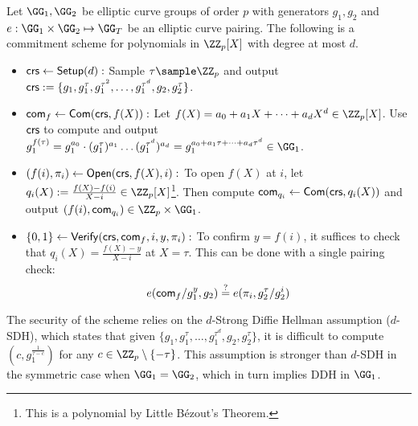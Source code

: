 \begin{construction}
Let $\GG_1, \GG_2$ be elliptic curve groups of order $p$ with generators $g_1,g_2$ and $e: \GG_1 \times \GG_2 \mapsto \GG_T$ be an elliptic curve pairing. The following is a commitment scheme for polynomials in $\ZZ_p[X]$ with degree at most $d$.
\begin{itemize}
    \item \underline{$\mathsf{crs} \gets {\mathsf{Setup}}(d):$} Sample $\tau \sample \ZZ_p$ and output $\mathsf{crs} := \{g_1, g_1^\tau, g_1^{\tau^2}, \dots, g_1^{\tau^d},\allowbreak g_2, g_2^\tau\}$.
    \item \underline{$\mathsf{com}_f \gets \mathsf{Com}(\mathsf{crs}, f(X)):$} Let $f(X) = a_0 + a_1 X + \dots + a_d X^d \in \ZZ_p[X]$. Use $\mathsf{crs}$ to compute and output $g_1^{f(\tau)} = g_1^{a_0} \cdot (g_1^\tau)^{a_1} \dots (g_1^{\tau^d})^{a_d} = g_1^{a_0 + a_1 \tau + \dots + a_d \tau^d}\allowbreak \in \GG_1$.
    \item \underline{$(f(i), \pi_i) \gets \mathsf{Open}(\mathsf{crs}, f(X), i):$} To open $f(X)$ at $i$, let $q_i(X) := \frac{f(X) - f(i)}{X - i}\allowbreak \in \ZZ_p[X]$\footnote{This is a polynomial by Little Bézout's Theorem.}. Then compute $\mathsf{com}_{q_i} \gets \mathsf{Com}(\mathsf{crs}, q_i(X))$ and output $(f(i),\allowbreak \com_{q_i}) \in \ZZ_p \times \GG_1$.
    \item \underline{$\{0,1\} \gets {\mathsf{Verify}}(\mathsf{crs}, \mathsf{com}_f, i, y, \pi_i):$} To confirm $y = f(i)$, it suffices to check that $q_i(X) = \frac{f(X) - y}{X - i}$ at $X=\tau$. This can be done with a single pairing check:
    \[
        e(\mathsf{com}_f / g_1^y, g_2) \stackrel{?}{=} e(\pi_i, g_2^\tau / g_2^i)
    \]
\end{itemize}
\end{construction}


The security of the scheme relies on the $d$-Strong Diffie Hellman assumption ($d$-SDH), which states that given $\{g_1, g_1^\tau, \dots, g_1^{\tau^d}, g_2, g_2^\tau\}$, it is difficult to compute $(c, g_1^{\frac{1}{\tau-c}})$ for any $c \in \ZZ_p \setminus \{-\tau\}$. This assumption is stronger than $d$-SDH in the symmetric case when $\GG_1 = \GG_2$, which in turn implies DDH in $\GG_1$.

